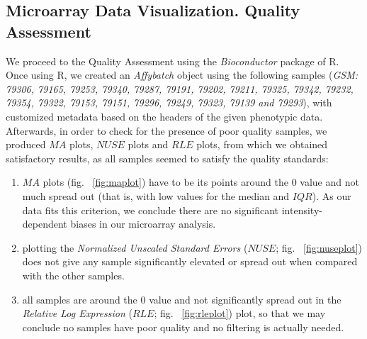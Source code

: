 \documentclass{article}
\begin{document}
\subsection{Microarray Data Visualization. Quality Assessment}
We proceed to the Quality Assessment using the {\it Bioconductor} package of R. Once using R, we created an {\it Affybatch} object using the following samples ({\it GSM: 79306, 79165, 79253, 79340, 79287, 79191, 79202, 79211, 79325, 79342, 79232, 79354, 79322, 79153, 79151, 79296, 79249, 79323, 79139 and 79293}), with customized metadata based on the headers of the given phenotypic data. Afterwards, in order to check for the presence of poor quality samples, we produced $MA$ plots, $NUSE$ plots and $RLE$ plots, from which we obtained satisfactory results, as all samples seemed to satisfy the quality standards: 
\begin{enumerate}
	\item $MA$ plots (fig. ~\ref{fig:maplot}) have to be its points around the $0$ value and not much spread out (that is, with low values for the median and $IQR$). As our data fits this criterion, we conclude there are no significant intensity-dependent biases in our microarray analysis.
	\item plotting the {\it Normalized Unscaled Standard Errors} ($NUSE$; fig. ~\ref{fig:nuseplot}) does not give any sample significantly elevated or spread out when compared with the other samples.
	\item all samples are around the $0$ value and not significantly spread out in the {\it Relative Log Expression} ($RLE$; fig. ~\ref{fig:rleplot}) plot, so that we may conclude no samples have poor quality and no filtering is actually needed.
\end{enumerate}
\end{document}

